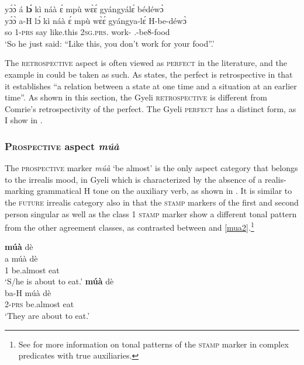 \ea\label{lo4}
  \glll yɔ́ɔ̀ á {\bfseries lɔ́} kì náà ɛ́ mpù wɛ̀ɛ́ gyángyálɛ́ bédéwɔ̀  \\
        yɔ́ɔ̀ a-H lɔ́ kì náà ɛ́ mpù wɛ̀ɛ́ gyángya-lɛ́ H-be-déwɔ̀  \\
        so 1-\textsc{prs} {\RETRO} say {\COMP} {\LOC} like.this 2\textsc{sg}.\textsc{prs}.{\NEG} work-{\NEG} {\OBJ}.{\LINK}-be8-food\\
    \trans `So he just said: ``Like this, you don't work for your food''.'
\z


The \textsc{retrospective} aspect is often viewed as \textsc{perfect} in the literature, and the example in  could be taken as such. As \citet[64]{comrie76} states, the perfect is retrospective in that it establishes ``a relation between a state at one time and a situation at an earlier time''. As shown in this section, the Gyeli \textsc{retrospective} is different from Comrie's retrospectivity of the perfect. The Gyeli \textsc{perfect} has a distinct form, as I show in .











\subsubsection{\textsc{Prospective} aspect {\itshape múà}}
\label{sec:PROSP}

The \textsc{prospective} marker {\itshape múà} `be almost' is the only aspect category that belongs to the irrealis mood, in Gyeli which is characterized by the absence of a realis-marking grammatical H tone on the auxiliary verb, as shown in . It is  similar to the \textsc{future} irrealis category also in that the \textsc{stamp} markers of the first and second person singular as well as the class 1 \textsc{stamp} marker show a different tonal pattern from the other agreement classes, as contrasted between  and \ref{mua2}.\footnote{See  for more information on tonal patterns of the \textsc{stamp} marker in complex predicates with true auxiliaries.}

\ea\label{mua}
\ea\label{mua1}
   {\bfseries múà} dè \\
             a múà dè  \\
             1  be.almost eat\\
    \trans `S/he is about to eat.'
\ex\label{mua2}
   {\bfseries múà} dè \\
         ba-H múà dè \\
             2-\textsc{prs} be.almost eat\\
    \trans `They are about to eat.'
\z
\z

